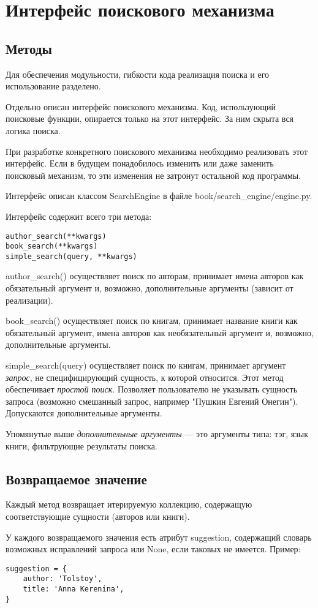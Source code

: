 \section{Интерфейс поискового механизма}

\subsection{Методы}


Для обеспечения модульности, гибкости кода реализация поиска и его использование разделено.

Отдельно описан интерфейс поискового механизма. Код, использующий поисковые функции, опирается только на этот интерфейс. За ним скрыта вся логика поиска.

При разработке конкретного поискового механизма необходимо реализовать этот интерфейс. Если в будущем понадобилось изменить или даже заменить поисковый механизм, то эти изменения не затронут остальной код программы.

Интерфейс описан классом SearchEngine в файле book/search\_engine/engine.py. 

Интерфейс содержит всего три метода:
\begin{verbatim}
author_search(**kwargs)
book_search(**kwargs)
simple_search(query, **kwargs)
\end{verbatim}


author\_search() осуществляет поиск по авторам, принимает имена авторов как обязательный аргумент и, возможно, дополнительные аргументы (зависит от реализации).

book\_search() осуществляет поиск по книгам, принимает название книги как обязательный аргумент, имена авторов как необязательный аргумент и, возможно, дополнительные аргументы. 

simple\_search(query) осуществляет поиск по книгам, принимает аргумент {\em запрос}, не специфицирующий сущность, к которой относится.
Этот метод обеспечивает {\em простой поиск}.
Позволяет пользователю не указывать сущность запроса (возможно смешанный запрос, например "Пушкин Евгений Онегин"). Допускаются дополнительные аргументы. 

Упомянутые выше {\em дополнительные аргументы} --- это аргументы типа: тэг, язык книги, фильтрующие результаты поиска. 


\subsection{Возвращаемое значение}

Каждый метод возвращает итерируемую коллекцию, содержащую соответствующие сущности (авторов или книги). 

У каждого возвращаемого значения есть атрибут suggestion, содержащий словарь возможных исправлений запроса или None, если таковых не имеется. Пример: 
\begin{verbatim}
suggestion = {
    author: 'Tolstoy',
    title: 'Anna Kerenina',
}
\end{verbatim}
